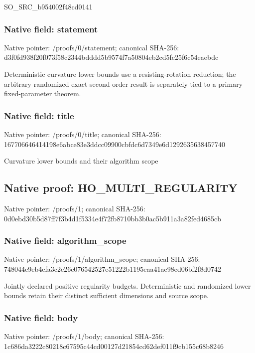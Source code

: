 \documentclass[10pt,a4paper]{article}
\begin{document}
\begingroup\raggedright\sloppy SO\_\allowbreak{}SRC\_\allowbreak{}b954002f48cd0141\par\endgroup

\subsubsection{Native field: statement}
Native pointer: /proofs/0/statement; canonical SHA-256: d3f0fd938f20f073f58c2344bdddd5b9574f7a50804eb2cd5fc25f6c54eaebdc

\begingroup\raggedright\sloppy Deterministic curvature lower bounds use a resisting-rotation reduction;\allowbreak{} the arbitrary-randomized exact-second-order result is separately tied to a primary fixed-parameter theorem.\par\endgroup

\subsubsection{Native field: title}
Native pointer: /proofs/0/title; canonical SHA-256: 167706646414198e6abce83e3ddcc09900cbfdc6d7349e6d1292635638457740

\begingroup\raggedright\sloppy Curvature lower bounds and their algorithm scope\par\endgroup

\subsection{Native proof: HO\_\allowbreak{}MULTI\_\allowbreak{}REGULARITY}
Native pointer: /proofs/1; canonical SHA-256: 0d0ebd30b5d87ff7f3b4d1f5334e4f72fb8710bb3b0ac5b911a3a82fed4685cb

\subsubsection{Native field: algorithm\_\allowbreak{}scope}
Native pointer: /proofs/1/algorithm\_\allowbreak{}scope; canonical SHA-256: 748044c9eb4efa3c2e26c076542527e51222b1195eaa41ae98ed06bf2f8d0742

\begingroup\raggedright\sloppy Jointly declared positive regularity budgets. Deterministic and randomized lower bounds retain their distinct sufficient dimensions and source scope.\par\endgroup

\subsubsection{Native field: body}
Native pointer: /proofs/1/body; canonical SHA-256: 1c686da3222c80218c67595c44cd00127d21854cd62def011f9cb155c68b8246
\end{document}
